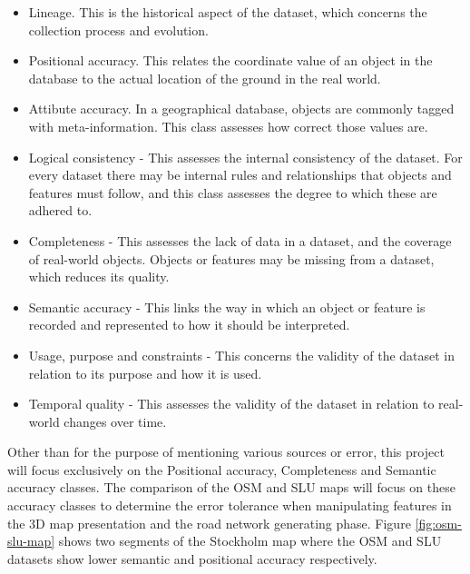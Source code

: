\documentclass[a4paper]{article}
\begin{document}
\begin{itemize}
  \item Lineage. This is the historical aspect of the dataset, which concerns the collection process and evolution.
  \item Positional accuracy. This relates the coordinate value of an object in the database to the actual location of the ground in the real world.
  \item Attibute accuracy. In a geographical database, objects are commonly tagged with meta-information. This class assesses how correct those values are.
  \item Logical consistency - This assesses the internal consistency of the dataset. For every dataset there may be internal rules and relationships that objects and features must follow, and this class assesses the degree to which these are adhered to.
  \item Completeness - This assesses the lack of data in a dataset, and the coverage of real-world objects. Objects or features may be missing from a dataset, which reduces its quality.
  \item Semantic accuracy - This links the way in which an object or feature is recorded and represented to how it should be interpreted.
  \item Usage, purpose and constraints - This concerns the validity of the dataset in relation to its purpose and how it is used.
  \item Temporal quality - This assesses the validity of the dataset in relation to real-world changes over time.
\end{itemize}

Other than for the purpose of mentioning various sources or error, this project will focus exclusively on the Positional accuracy, Completeness and Semantic accuracy classes.
The comparison of the OSM and SLU maps will focus on these accuracy classes to determine the error tolerance when manipulating features in the 3D map presentation and the road network generating phase.
Figure \ref{fig:osm-slu-map} shows two segments of the Stockholm map where the OSM and SLU datasets show lower semantic and positional accuracy respectively.
\end{document}
